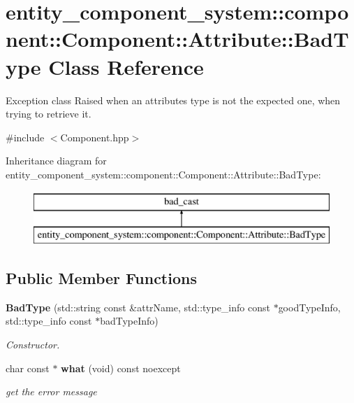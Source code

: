 \section{entity\+\_\+component\+\_\+system\+:\+:component\+:\+:Component\+:\+:Attribute\+:\+:Bad\+Type Class Reference}
\label{classentity__component__system_1_1component_1_1_component_1_1_attribute_1_1_bad_type}


Exception class Raised when an attribute\textquotesingle{}s type is not the expected one, when trying to retrieve it.  




{\ttfamily \#include $<$Component.\+hpp$>$}

Inheritance diagram for entity\+\_\+component\+\_\+system\+:\+:component\+:\+:Component\+:\+:Attribute\+:\+:Bad\+Type\+:\begin{figure}[H]
\begin{center}
\leavevmode
\includegraphics[height=2.000000cm]{d2/d5b/classentity__component__system_1_1component_1_1_component_1_1_attribute_1_1_bad_type}
\end{center}
\end{figure}
\subsection*{Public Member Functions}
\begin{DoxyCompactItemize}
\item 
{\bf Bad\+Type} (std\+::string const \&attr\+Name, std\+::type\+\_\+info const $\ast$good\+Type\+Info, std\+::type\+\_\+info const $\ast$bad\+Type\+Info)
\begin{DoxyCompactList}\small\item\em Constructor. \end{DoxyCompactList}\item 
char const  $\ast$ {\bf what} (void) const noexcept
\begin{DoxyCompactList}\small\item\em get the error message \end{DoxyCompactList}\end{DoxyCompactItemize}


